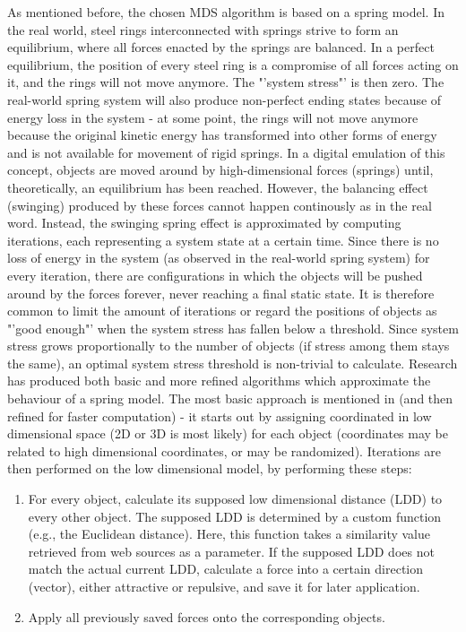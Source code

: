 As mentioned before, the chosen MDS algorithm is based on a spring model. In the real world, steel rings interconnected with springs strive to form an equilibrium, where all forces enacted by the springs are balanced. In a perfect equilibrium, the position of every steel ring is a compromise of all forces acting on it, and the rings will not move anymore. The "'system stress"' is then zero. The real-world spring system will also produce non-perfect ending states because of energy loss in the system - at some point, the rings will not move anymore because the original kinetic energy has transformed into other forms of energy and is not available for movement of rigid springs.
In a digital emulation of this concept, objects are moved around by high-dimensional forces (springs) until, theoretically, an equilibrium has been reached. However, the balancing effect (swinging) produced by these forces cannot happen continously as in the real word. Instead, the swinging spring effect is approximated by computing iterations, each representing a system state at a certain time. Since there is no loss of energy in the system (as observed in the real-world spring system) for every iteration, there are configurations in which the objects will be pushed around by the forces forever, never reaching a final static state. It is therefore common to limit the amount of iterations or regard the positions of objects as "'good enough"' when the system stress has fallen below a threshold. Since system stress grows proportionally to the number of objects (if stress among them stays the same), an optimal system stress threshold is non-trivial to calculate.
Research has produced both basic and more refined algorithms which approximate the behaviour of a spring model. 
The most basic approach is mentioned in \cite{Chalmers:1996:LIT:244979.245035} (and then refined for faster computation) - 
it starts out by assigning coordinated in low dimensional space (2D or 3D is most likely) for each object (coordinates may be related to high dimensional coordinates, or may be randomized). Iterations are then performed on the low dimensional model, by performing these steps:

\begin{enumerate}
	\item For every object, calculate its supposed low dimensional distance (LDD) to every other object. The supposed LDD is determined by a custom function (e.g., the Euclidean distance). Here, this function takes a similarity value retrieved from web sources as a parameter.
	\subitem If the supposed LDD does not match the actual current LDD, calculate a force into a certain direction (vector), either attractive or repulsive, and save it for later application.
	\item Apply all previously saved forces onto the corresponding objects.
\end{enumerate}		

